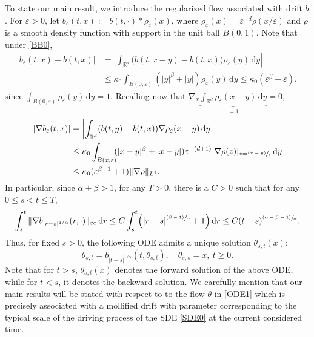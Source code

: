 \documentclass[JEP,XML,SOM,Unicode,published]{cedram}
\newcommand{\psfrac}[2]{\sfrac{(#1)}{#2}}
\newcommand{\rd}{\mathrm{d}}
\theoremstyle{plain}
\theoremstyle{definition}
\let\eps\varepsilon
\newcommand\mR{\mathbb{R}}
\newcommand\1{{\mathbf{1}}}
\newcommand{\dif}{\,\mathrm{d}}
\begin{document}
To state our main result, we introduce the regularized flow associated with drift $b$.
For $\eps>0$, let $b_\eps(t,x):=b(t,\cdot)*\rho_\eps(x)$, where $\rho_\eps(x)=\eps^{-d}\rho(x/\eps)$
and $\rho$ is a smooth density function with support in the unit ball $B(0,1)$.
Note that under \eqref{BB0},
\begin{equation}
\begin{aligned}\label{LL19}
|b_\eps(t,x)-b(t,x)|&=
\left|\int_{\mR^d} \bigl(b(t,x-y)-b(t,x)\bigr)\rho_\eps(y)\dif y\right|\\
&\le 
\kappa_0 \int_{B(0,\eps)}( |y|^\beta+|y|) \rho_\eps(y)\dif y\leq \kappa_0(\eps^\beta+\eps),
\end{aligned}
\end{equation}
{since $\int_{B(0,\eps)}\rho_\eps(y)\dif y=1 $. Recalling now that $\nabla_x\underbrace{\int_{\mR^d} \rho_\eps(x-y) \dif y}_{=1}=0 $},
\begin{equation}
\begin{aligned}\label{LL1}
|\nabla b_\eps(t,x)|
&=\left|\int_{\mR^d}(b(t,y)-b(t,x))\nabla\rho_\eps(x-y)\dif y\right|\\
&\leq \kappa_0\int_{B(x,\eps)} \!\!(|x-y|^\beta+|x-y|) \eps^{-(d+1)}|\nabla \rho(z)|_{z=\psfrac{x-y}\eps}\,\rd y
\\
&\le  \kappa_0(\eps^{\beta-1}+1)\|\nabla\rho\|_{L^1}.
\end{aligned}
\end{equation}
In particular, since $\alpha+\beta>1$, for any $T>0$, there is a $C>0$ such that for any $0\leq s<t\leq T$,
\begin{equation}\label{LL01}
\int^t_s\|\nabla b_{|r-s|^{1/\alpha}}(r,\cdot)\|_\infty\dif r
\leq C
\int^t_s\Bigl(|r-s|^{\psfrac{\beta-1}{\alpha}}+1\Bigr)\dif r
\leq C(t-s)^{\psfrac{\alpha+\beta-1}{\alpha}}.
\end{equation}
Thus, for fixed $s>0$, the following ODE admits a unique solution $\theta_{s,t}(x)$:
\begin{equation}\label{ODE1}
\dot\theta_{s,t}=b_{|t-s|^{1/\alpha}}(t,\theta_{s,t}),\quad \theta_{s,s}=x,\ t\geq 0.
\end{equation}
Note that for $t>s$, $\theta_{s,t}(x)$ denotes the forward solution of the above ODE, while for $t<s$,
it denotes the backward solution. We carefully mention that our main results will be stated with respect to to the flow $\theta $ in \eqref{ODE1} which is precisely associated with a mollified drift with parameter corresponding to the typical scale of the driving process of the SDE \eqref{SDE0} at the current considered time.
\end{document}
